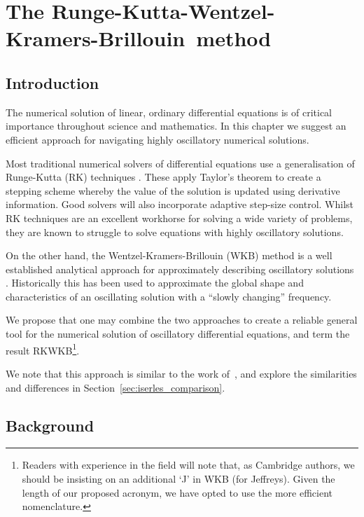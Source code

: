 \chapter[The RKWKB method]{The Runge-Kutta-Wentzel-Kramers-Brillouin~method}
\label{chp:RK}

\section{Introduction}
\label{sec:introduction}
The numerical solution of linear, ordinary differential equations is of critical importance throughout science and mathematics. In this chapter we suggest an efficient approach for navigating highly oscillatory numerical solutions.

Most traditional numerical solvers of differential equations use a generalisation of Runge-Kutta (RK) techniques \citep{Press+2007}. These apply Taylor's theorem to create a stepping scheme whereby the value of the solution is updated using derivative information. Good solvers will also incorporate adaptive step-size control.
Whilst RK techniques are an excellent workhorse for solving a wide variety of problems, they are known to struggle to solve equations with highly oscillatory solutions.

On the other hand, the Wentzel-Kramers-Brillouin (WKB) method is a well established analytical approach for approximately describing oscillatory solutions \citep{RHB,Bender+2010}. Historically this has been used to approximate the global shape and characteristics of an oscillating solution with a ``slowly changing'' frequency.

We propose that one may combine the two approaches to create a reliable general tool for the numerical solution of oscillatory differential equations, and term the result RKWKB\footnote{Readers with experience in the field will note that, as Cambridge authors, we should be insisting on an additional `J' in WKB (for Jeffreys). Given the length of our proposed acronym, we have opted to use the more efficient nomenclature.}.

We note that this approach is similar to the work of~\cite{Iserles02globalerror,Iserles01thinkglobally}, and explore the similarities and differences in Section~\ref{sec:iserles_comparison}.


\section{Background}
